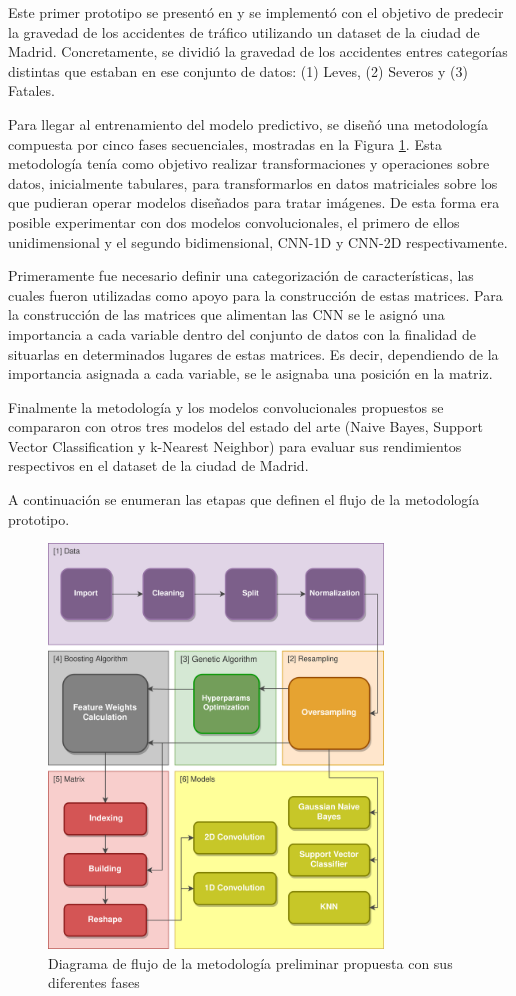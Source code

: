 Este primer prototipo se presentó en \cite{PEREZSALA2023113245} y se implementó con el objetivo de predecir la gravedad de los accidentes de tráfico utilizando un dataset de la ciudad de Madrid. Concretamente, se dividió la gravedad de los accidentes entres categorías distintas que estaban en ese conjunto de datos: (1) Leves, (2) Severos y (3) Fatales.

Para llegar al entrenamiento del modelo predictivo, se diseñó una metodología compuesta por cinco fases secuenciales, mostradas en la Figura \ref{figDegree}. Esta metodología tenía como objetivo realizar transformaciones y operaciones sobre datos, inicialmente tabulares, para transformarlos en datos matriciales sobre los que pudieran operar modelos diseñados para tratar imágenes. De esta forma era posible experimentar con dos modelos convolucionales, el primero de ellos unidimensional y el segundo bidimensional, CNN-1D y CNN-2D respectivamente.

Primeramente fue necesario definir una categorización de características, las cuales fueron utilizadas como apoyo para la construcción de estas matrices. Para la construcción de las matrices que alimentan las CNN se le asignó una importancia a cada variable dentro del conjunto de datos con la finalidad de situarlas en determinados lugares de estas matrices. Es decir, dependiendo de la importancia asignada a cada variable, se le asignaba una posición en la matriz. 

Finalmente la metodología y los modelos convolucionales propuestos se compararon con otros tres modelos del estado del arte (Naive Bayes, Support Vector Classification y k-Nearest Neighbor) para evaluar sus rendimientos respectivos en el dataset de la ciudad de Madrid.

A continuación se enumeran las etapas que definen el flujo de la metodología prototipo.

\begin{figure}[h]
	\centering
	\includegraphics[width=3.5in]{Figures/1stPaper/Data_flow.png}
	\caption{Diagrama de flujo de la metodología preliminar propuesta con sus diferentes fases}
	\label{figDegree}
\end{figure}

